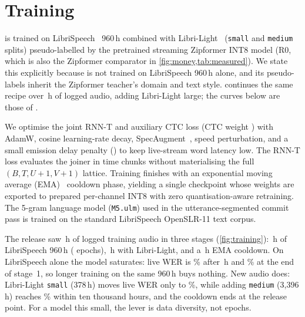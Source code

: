 \section{Training}\label{sec:training}

 \ultra{} \PriorVer{} is trained on
LibriSpeech~\cite{panayotov2015librispeech} 960\,h combined with Libri-Light~\cite{kahn2020librilight}
(\texttt{small} and \texttt{medium} splits) pseudo-labelled by the pretrained streaming Zipformer
INT8 model (R0, which is also the Zipformer comparator in \cref{fig:money,tab:measured}). We state
this explicitly because \ultra{} \PriorVer{} is not trained on LibriSpeech 960\,h alone, and its
pseudo-labels inherit the Zipformer teacher's domain and text style. \ultra{} \ReleaseVer{} continues the same
recipe over \CandTrainKh\,h of logged audio, adding Libri-Light large; the curves below are those of \PriorVer{}.

 We optimise the joint RNN-T and auxiliary CTC loss (CTC weight \CtcWeight) with
AdamW, cosine learning-rate decay, SpecAugment~\cite{park2019specaugment}, speed perturbation, and
a small emission delay penalty (\DelayPenalty) to keep live-stream word latency low. The RNN-T loss
evaluates the joiner in time chunks without materialising the full $(B,T,U{+}1,V{+}1)$ lattice.
Training finishes with an exponential moving average (EMA)~\cite{polyak1992ema} cooldown phase,
yielding a single checkpoint whose weights are exported to prepared per-channel INT8 with zero
quantisation-aware retraining. The 5-gram language model (\texttt{M5.ulm}) used in the
utterance-segmented commit pass is trained on the standard LibriSpeech OpenSLR-11 text corpus.

%
 The release saw \TrainTotalKh\,h of logged training audio in three stages
(\cref{fig:training}): \TrainStageOneKh\,h of LibriSpeech 960\,h (\TrainStageOneEpochs{} epochs),
\TrainStageTwoKh\,h with Libri-Light, and a \TrainCoolKh\,h EMA cooldown. On LibriSpeech alone the
model saturates: live WER is \TrainPlateauMid\% after \TrainPlateauMidKh\,h and \TrainPlateauEnd\% at
the end of stage~1, so longer training on the same 960\,h buys nothing. New audio does: Libri-Light
\texttt{small} (378\,h) moves live WER only to \TrainSmallLive\%, while adding \texttt{medium}
(3{,}396\,h) reaches \TrainMediumLive\% within ten thousand hours, and the cooldown ends at the release
point. For a model this small, the lever is data diversity, not epochs.
